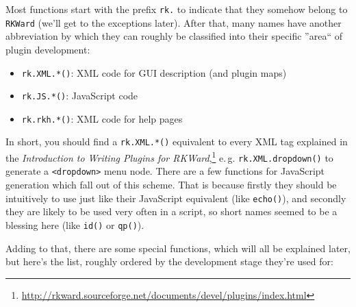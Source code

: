 \documentclass[a4paper,10pt]{scrartcl}
\begin{document}
Most functions start with the prefix  \texttt{rk.} to indicate that they somehow belong to  \texttt{RKWard}
(we'll get to the exceptions later). After that, many names have another abbreviation by which they can
roughly be classified into their specific ''area`` of plugin development:

\begin{itemize}
	\item  \texttt{rk.XML.*()}: XML code for GUI description (and plugin maps)
	\item  \texttt{rk.JS.*()}: JavaScript code
	\item  \texttt{rk.rkh.*()}: XML code for help pages
\end{itemize}

In short, you should find a  \texttt{rk.XML.*()} equivalent to every XML tag explained in the
\textit{Introduction to Writing Plugins for
RKWard},\footnote{\url{http://rkward.sourceforge.net/documents/devel/plugins/index.html}}
e.\,g.  \texttt{rk.XML.dropdown()} to generate a  \texttt{<dropdown>} menu node. There are a few functions for
JavaScript generation which fall out of this scheme. That is because firstly they should be intuitively to use
just like their JavaScript equivalent (like  \texttt{echo()}), and secondly they are likely to be used very often
in a script, so short names seemed to be a blessing here (like  \texttt{id()} or  \texttt{qp()}).

Adding to that, there are some special functions, which will all be explained later, but here's the list,
roughly ordered by the development stage they're used for:
\end{document}

